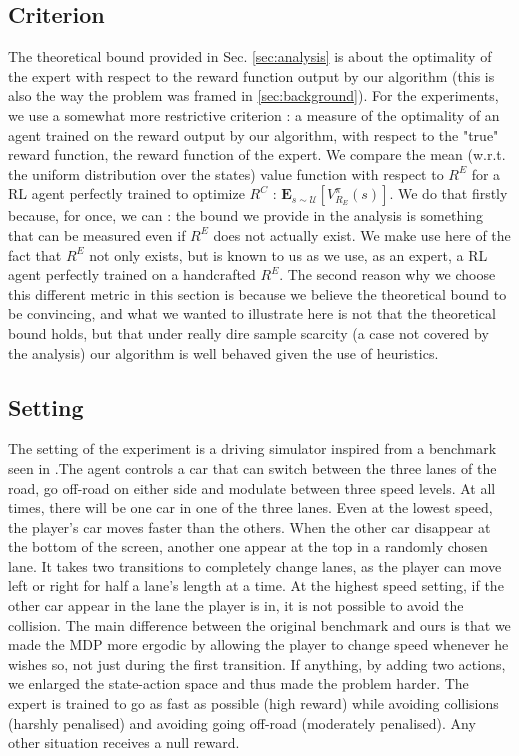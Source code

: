\documentclass[smallextended]{svjour3}
\begin{document}
\subsection{Criterion}
\label{subsec:criterion}
The theoretical bound provided in Sec. \ref{sec:analysis} is about the optimality of the expert with respect to the reward function output by our algorithm (this is also the way the problem was framed in \ref{sec:background}). For the experiments, we use a somewhat more restrictive criterion : a measure of the optimality of an agent trained on the reward output by our algorithm, with respect to the "true" reward function, the reward function of the expert. We compare the mean (w.r.t. the uniform distribution over the states) value function with respect to $R^E$ for a RL agent perfectly trained to optimize $R^C$ : $\mathbf{E}_{s\sim\mathcal{U}}[V^{\pi}_{R_E}(s)]$. We do that firstly because, for once, we can : the bound we provide in the analysis is something that can be measured even if $R^E$ does not actually exist. We make use here of the fact that $R^E$ not only exists, but is known to us as we use, as an expert, a RL agent perfectly trained on a handcrafted $R^E$. The second reason why we choose this different metric in this section is because we believe the theoretical bound to be convincing, and what we wanted to illustrate here is not that the theoretical bound holds, but that under really dire sample scarcity (a case not covered by the analysis) our algorithm is well behaved given the use of heuristics.
\subsection{Setting}
\label{subsec:setting}
The setting of the experiment is a driving simulator inspired from a benchmark seen in \cite{syed2008apprenticeship,syed2008game}.The agent controls a car that can switch between the three lanes of the road, go off-road on either side and modulate between three speed levels. At all times, there will be one car in one of the three lanes. Even at the lowest speed, the player's car moves faster than the others. When the other car disappear at the bottom of the screen, another one appear at the top in a randomly chosen lane. It takes two transitions to completely change lanes, as the player can move left or right for half a lane's length at a time. At the highest speed setting, if the other car appear in the lane the player is in, it is not possible to avoid the collision. The main difference between the original benchmark and ours is that we made the MDP more ergodic by allowing the player to change speed whenever he wishes so, not just during the first transition. If anything, by adding two actions, we enlarged the state-action space and thus made the problem harder.
The expert is trained to go as fast as possible (high reward) while avoiding collisions (harshly penalised) and avoiding going off-road (moderately penalised). Any other situation receives a null reward.
\end{document}
